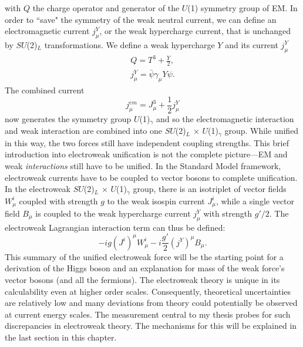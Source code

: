 with $Q$ the charge operator and generator of the $U$(1) symmetry group of EM. In order to ``save" the symmetry of the weak neutral current, we can define an electromagnetic current $j_\mu^Y$, or the weak hypercharge current, that is unchanged by $SU$(2)$_L$ transformations. We define a weak hypercharge $Y$ and its current $j_\mu^Y$
\begin{equation}
\begin{split}
Q=T^3+\frac{Y}{2}, \\
j_\mu^Y =\bar{\psi}\gamma_\mu Y \psi.
\end{split}
\end{equation}
The combined current 
\begin{equation}
j_\mu^{em} = J_\mu^3+\frac{1}{2}j_\mu^Y
\end{equation}
now generates the symmetry group $U$(1)$_\gamma$ and so the electromagnetic interaction and weak interaction are combined into one $SU$(2)$_L$ $\times$ $U$(1)$_\gamma$ group. While unified in this way, the two forces still have independent coupling strengths. This brief introduction into electroweak unification is not the complete picture---EM and weak \textit{interactions} still have to be unified. In the Standard Model framework, electroweak currents have to be coupled to vector bosons to complete unification. In the electroweak $SU$(2)$_L$ $\times$ $U$(1)$_\gamma$ group, there is an isotriplet of vector fields $W_\mu^i$ coupled with strength $g$ to the weak isospin current $J_\mu^i$, while a single vector field $B_\mu$ is coupled to the weak hypercharge current $j_\mu^Y$ with strength $g'/2$. The electroweak Lagrangian interaction term can thus be defined:
\begin{equation}
-i g (J^i)^\mu W_\mu^i-i\frac{g'}{2}(j^Y)^\mu B_\mu .
\end{equation}
This summary of the unified electroweak force will be the starting point for a derivation of the Higgs boson and an explanation for mass of the weak force's vector bosons (and all the fermions). The electroweak theory is unique in its calculability even at higher order scales. Consequently, theoretical uncertainties are relatively low and many deviations from theory could potentially be observed at current energy scales. The measurement central to my thesis probes for such discrepancies in electroweak theory. The mechanisms for this will be explained in the last section in this chapter. 

